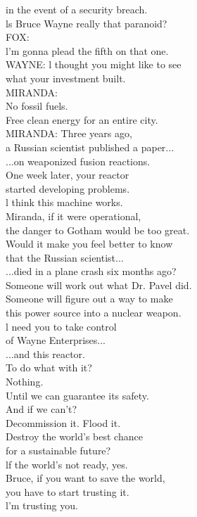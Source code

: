\documentclass{article}
\begin{document}
\begin{multicols}{3}
in the event of a security breach.\\
ls Bruce Wayne really that paranoid?\\
FOX:\\
l'm gonna plead the fifth on that one.\\
WAYNE: l thought you might like to see\\
what your investment built.\\
MIRANDA:\\
No fossil fuels.\\
Free clean energy for an entire city.\\
MIRANDA: Three years ago,\\
a Russian scientist published a paper...\\
...on weaponized fusion reactions.\\
One week later, your reactor\\
started developing problems.\\
l think this machine works.\\
Miranda, if it were operational,\\
the danger to Gotham would be too great.\\
Would it make you feel better to know\\
that the Russian scientist...\\
...died in a plane crash six months ago?\\
Someone will work out what Dr. Pavel did.\\
Someone will figure out a way to make\\
this power source into a nuclear weapon.\\
l need you to take control\\
of Wayne Enterprises...\\
...and this reactor.\\
To do what with it?\\
Nothing.\\
Until we can guarantee its safety.\\
And if we can't?\\
Decommission it. Flood it.\\
Destroy the world's best chance\\
for a sustainable future?\\
lf the world's not ready, yes.\\
Bruce, if you want to save the world,\\
you have to start trusting it.\\
l'm trusting you.\\

\end{multicols}
\end{document}
